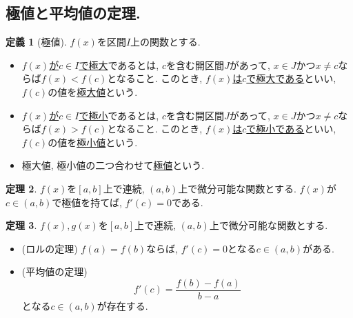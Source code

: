 \documentclass[dvipdfmx,a4paper,11pt]{article}
\theoremstyle{definition}
\newtheorem{thm}{定理}
\newtheorem{dfn}[thm]{定義}
\begin{document}
 \subsection{極値と平均値の定理.}
 \begin{tcolorbox}[
    colback = white,
    colframe = green!35!black,
    fonttitle = \bfseries,
    breakable = true]
    \begin{dfn}[極値]
$f(x)$を区間$I$上の関数とする.
\begin{itemize}
\item \underline{$f(x)$が$c\in I$で極大}であるとは, $c$を含む開区間$J$があって, $x \in J$かつ$x \neq c$ならば$f(x) < f(c)$となること.
このとき, \underline{$f(x)$は$c$で極大である}といい, $f(c)$の値を\underline{極大値}という.
\item \underline{$f(x)$が$c\in I$で極小}であるとは, $c$を含む開区間$J$があって, $x \in J$かつ$x \neq c$ならば$f(x) > f(c)$となること.
このとき, \underline{$f(x)$は$c$で極小である}といい, $f(c)$の値を\underline{極小値}という.
\item  極大値, 極小値の二つ合わせて\underline{極値}という.%
\end{itemize}

    \end{dfn}
\end{tcolorbox}

\begin{tcolorbox}[
    colback = white,
    colframe = green!35!black,
    fonttitle = \bfseries,
    breakable = true]
    \begin{thm}
    $f(x)$を$[a,b]$上で連続, $(a,b)$上で微分可能な関数とする.
    $f(x)$が$c \in (a,b)$で極値を持てば, $f'(c) = 0$である.
    \end{thm}
\end{tcolorbox}

\begin{tcolorbox}[
    colback = white,
    colframe = green!35!black,
    fonttitle = \bfseries,
    breakable = true]
    \begin{thm}
    $f(x), g(x)$を$[a,b]$上で連続, $(a,b)$上で微分可能な関数とする.
\begin{itemize}
\setlength{\parskip}{0cm} 
  \setlength{\itemsep}{0cm}
\item (ロルの定理) $f(a) = f(b)$ならば, $f'(c) = 0$となる$c \in (a,b)$がある.
\item (平均値の定理)
$$
f'(c) = \frac{f(b)-f(a)}{b-a}
$$
となる$c \in (a,b)$が存在する. 
\end{itemize}

    \end{thm}
\end{tcolorbox}
\end{document}
